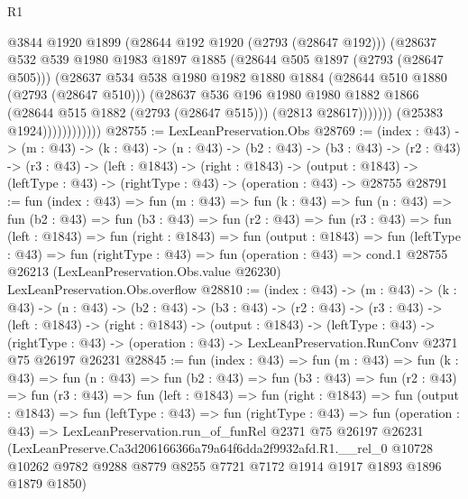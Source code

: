 \begin{lexlean}{R1}
\begin{coremodule}
                                @3844
                                @1920
                                @1899
                                (@28644 @192 @1920 (@2793 (@28647 @192)))
                                (@28637
                                  @532
                                  @539
                                  @1980
                                  @1983
                                  @1897
                                  @1885
                                  (@28644 @505 @1897 (@2793 (@28647 @505)))
                                  (@28637
                                    @534
                                    @538
                                    @1980
                                    @1982
                                    @1880
                                    @1884
                                    (@28644 @510 @1880 (@2793 (@28647 @510)))
                                    (@28637
                                      @536
                                      @196
                                      @1980
                                      @1980
                                      @1882
                                      @1866
                                      (@28644 @515 @1882 (@2793 (@28647 @515)))
                                      (@2813 @28617)))))))
                          (@25383 @1924))))))))))))
@28755 := LexLeanPreservation.Obs
@28769 := (index : @43) ->
  (m : @43) ->
  (k : @43) ->
  (n : @43) ->
  (b2 : @43) ->
  (b3 : @43) ->
  (r2 : @43) ->
  (r3 : @43) ->
  (left : @1843) ->
  (right : @1843) ->
  (output : @1843) -> (leftType : @43) -> (rightType : @43) -> (operation : @43) -> @28755
@28791 := fun (index : @43) =>
  fun (m : @43) =>
  fun (k : @43) =>
  fun (n : @43) =>
  fun (b2 : @43) =>
  fun (b3 : @43) =>
  fun (r2 : @43) =>
  fun (r3 : @43) =>
  fun (left : @1843) =>
  fun (right : @1843) =>
  fun (output : @1843) =>
  fun (leftType : @43) =>
  fun (rightType : @43) =>
  fun (operation : @43) =>
  cond.{1} @28755 @26213 (LexLeanPreservation.Obs.value @26230) LexLeanPreservation.Obs.overflow
@28810 := (index : @43) ->
  (m : @43) ->
  (k : @43) ->
  (n : @43) ->
  (b2 : @43) ->
  (b3 : @43) ->
  (r2 : @43) ->
  (r3 : @43) ->
  (left : @1843) ->
  (right : @1843) ->
  (output : @1843) ->
  (leftType : @43) ->
  (rightType : @43) -> (operation : @43) -> LexLeanPreservation.RunConv @2371 @75 @26197 @26231
@28845 := fun (index : @43) =>
  fun (m : @43) =>
  fun (k : @43) =>
  fun (n : @43) =>
  fun (b2 : @43) =>
  fun (b3 : @43) =>
  fun (r2 : @43) =>
  fun (r3 : @43) =>
  fun (left : @1843) =>
  fun (right : @1843) =>
  fun (output : @1843) =>
  fun (leftType : @43) =>
  fun (rightType : @43) =>
  fun (operation : @43) =>
  LexLeanPreservation.run_of_funRel
    @2371
    @75
    @26197
    @26231
    (LexLeanPreserve.Ca3d206166366a79a64f6dda2f9932afd.R1.__rel_0
      @10728
      @10262
      @9782
      @9288
      @8779
      @8255
      @7721
      @7172
      @1914
      @1917
      @1893
      @1896
      @1879
      @1850)
\end{coremodule}
\end{lexlean}
